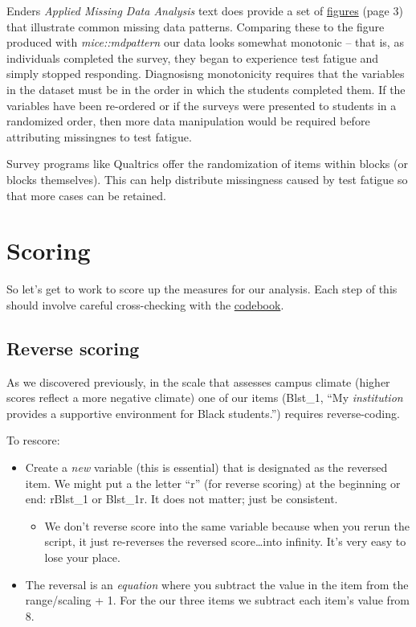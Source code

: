 \documentclass[
  11pt,
]{book}
\providecommand{\tightlist}{%
  \setlength{\itemsep}{0pt}\setlength{\parskip}{0pt}}
\begin{document}
Enders \citeyearpar{enders_applied_2010} \emph{Applied Missing Data Analysis} text does provide a set of \href{https://www.google.com/books/edition/Applied_Missing_Data_Analysis/uHt4EAAAQBAJ?hl=en\&gbpv=1\&dq=enders+missing+data\&pg=PP1\&printsec=frontcover}{figures} (page 3) that illustrate common missing data patterns. Comparing these to the figure produced with \emph{mice::mdpattern} our data looks somewhat monotonic -- that is, as individuals completed the survey, they began to experience test fatigue and simply stopped responding. Diagnosisng monotonicity requires that the variables in the dataset must be in the order in which the students completed them. If the variables have been re-ordered or if the surveys were presented to students in a randomized order, then more data manipulation would be required before attributing missingnes to test fatigue.

Survey programs like Qualtrics offer the randomization of items within blocks (or blocks themselves). This can help distribute missingness caused by test fatigue so that more cases can be retained.

\hypertarget{scoring}{%
\section{Scoring}\label{scoring}}

So let's get to work to score up the measures for our analysis. Each step of this should involve careful cross-checking with the \href{https://github.com/lhbikos/ReC_MultivModel/blob/main/Rate_a_Course_Codebook.pdf}{codebook}.

\hypertarget{reverse-scoring}{%
\subsection{Reverse scoring}\label{reverse-scoring}}

As we discovered previously, in the scale that assesses campus climate (higher scores reflect a more negative climate) one of our items (Blst\_1, ``My \emph{institution} provides a supportive environment for Black students.'') requires reverse-coding.

To rescore:

\begin{itemize}
\tightlist
\item
  Create a \emph{new} variable (this is essential) that is designated as the reversed item. We might put a the letter ``r'' (for reverse scoring) at the beginning or end: rBlst\_1 or Blst\_1r. It does not matter; just be consistent.

  \begin{itemize}
  \tightlist
  \item
    We don't reverse score into the same variable because when you rerun the script, it just re-reverses the reversed score\ldots into infinity. It's very easy to lose your place.
  \end{itemize}
\item
  The reversal is an \emph{equation} where you subtract the value in the item from the range/scaling + 1. For the our three items we subtract each item's value from 8.
\end{itemize}
\end{document}

